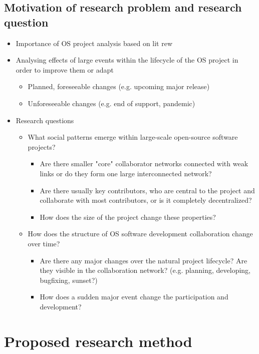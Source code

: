 \subsection{Motivation of research problem and research question}

\begin{itemize}
    \item Importance of OS project analysis based on lit rew
    \item Analysing effects of large events within the lifecycle of the OS project in order to improve them or adapt
    \begin{itemize}
        \item Planned, foreseeable changes (e.g. upcoming major release)
        \item Unforeseeable changes (e.g. end of support, pandemic)
    \end{itemize}
    \item Research questions
    \begin{itemize}
        \item What social patterns emerge within large-scale open-source software projects?
        \begin{itemize}
            \item Are there smaller "core" collaborator networks connected with weak links or do they form one large interconnected network?
            \item Are there usually key contributors, who are central to the project and collaborate with most contributors, or is it completely decentralized?
            \item How does the size of the project change these properties?
        \end{itemize}
        \item How does the structure of OS software development collaboration change over time?
        \begin{itemize}
            \item Are there any major changes over the natural project lifecycle? Are they visible in the collaboration network? (e.g. planning, developing, bugfixing, sunset?)
            \item How does a sudden major event change the participation and development?
        \end{itemize}
    \end{itemize}
\end{itemize}


\section{Proposed research method}

